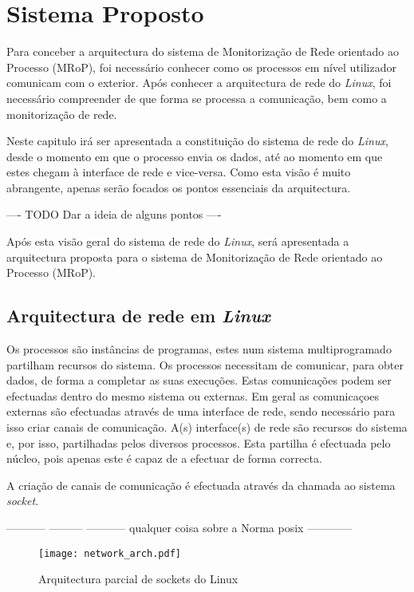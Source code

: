 \chapter{Sistema Proposto}
\label{cap:Estrutura}

Para conceber a arquitectura do sistema de Monitorização de Rede orientado ao Processo (MRoP), foi necessário conhecer como os processos em nível utilizador comunicam com o exterior.
Após conhecer a arquitectura de rede do \textit{Linux}, foi necessário compreender de que forma se processa a comunicação, bem como a monitorização de rede.

Neste capitulo irá ser apresentada a constituição do sistema de rede do \textit{Linux}, desde o momento em que o processo envia os dados, até ao momento em que estes chegam à interface de rede e vice-versa.
Como esta visão é muito abrangente, apenas serão focados os pontos essenciais da arquitectura. 

---- TODO Dar a ideia de alguns pontos ----

Após esta visão geral do sistema de rede do \textit{Linux}, será apresentada a arquitectura proposta para o sistema de Monitorização de Rede orientado ao Processo (MRoP).



\section{Arquitectura de rede em \textit{Linux}}
\label{sub:network}

Os processos são instâncias de programas, estes num sistema multiprogramado partilham recursos do sistema.
Os processos necessitam de comunicar, para obter dados, de forma a completar as suas execuções.
Estas comunicações podem ser efectuadas dentro do mesmo sistema ou externas.
Em geral as comunicaçoes externas são efectuadas através de uma interface de rede, sendo necessário para isso criar canais de comunicação.
A(s) interface(s) de rede são recursos do sistema e, por isso, partilhadas pelos diversos processos.
Esta partilha é efectuada pelo núcleo, pois apenas este é capaz de a efectuar de forma correcta.

A criação de canais de comunicação é efectuada através da chamada ao sistema \textit{socket}.

----------- --------- ----------- qualquer coisa sobre a Norma posix ------------

\begin{figure}[htbp]
\centering
\texttt{[image: network\_arch.pdf]} 
\caption{Arquitectura parcial de sockets do Linux}
\label{fig:network_arch}
\end{figure}

